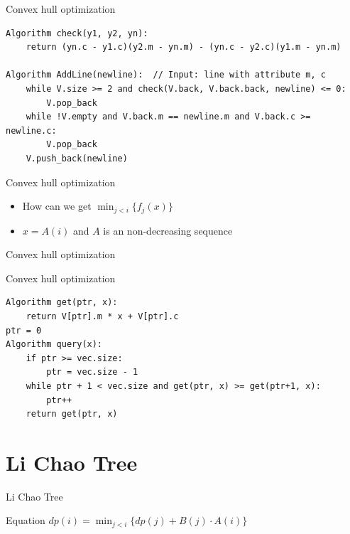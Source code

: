 \documentclass[aspectratio=169,xcolor=dvipsnames]{beamer}
\begin{document}
\begin{frame}{Convex hull optimization}
\begin{examples}
\begin{verbatim}
Algorithm check(y1, y2, yn):
    return (yn.c - y1.c)(y2.m - yn.m) - (yn.c - y2.c)(y1.m - yn.m)

Algorithm AddLine(newline):  // Input: line with attribute m, c
    while V.size >= 2 and check(V.back, V.back.back, newline) <= 0:
        V.pop_back
    while !V.empty and V.back.m == newline.m and V.back.c >= newline.c:
        V.pop_back
    V.push_back(newline)
\end{verbatim}
\end{examples}
\end{frame}

\begin{frame}{Convex hull optimization}
\begin{itemize}
    \item How can we get $\displaystyle\min_{j<i}\{f_j(x)\}$
    \item $x = A(i)$ and $A$ is an non-decreasing sequence
\end{itemize}

\end{frame}

\begin{frame}{Convex hull optimization}
\end{frame}

\begin{frame}{Convex hull optimization}
\begin{examples}
\begin{verbatim}
Algorithm get(ptr, x):
    return V[ptr].m * x + V[ptr].c
ptr = 0
Algorithm query(x):
    if ptr >= vec.size:
        ptr = vec.size - 1
    while ptr + 1 < vec.size and get(ptr, x) >= get(ptr+1, x):
        ptr++
    return get(ptr, x)
\end{verbatim}
\end{examples}

\end{frame}

\section{Li Chao Tree}
\begin{frame}[plain]{Li Chao Tree}
\begin{block}{Equation}
    $dp(i) = \displaystyle\min_{j<i}\{dp(j)+B(j)\cdot A(i)\}$
\end{block}
\end{frame}
\end{document}
